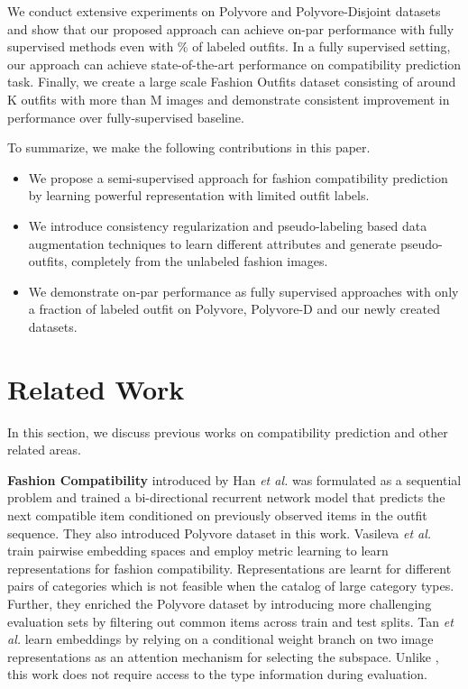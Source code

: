 \documentclass[sigconf]{acmart}
\newcommand{\etal}{\textit{et al.}}
\begin{document}
We conduct extensive experiments on Polyvore and Polyvore-Disjoint \cite{eccv2018learning} datasets and show that our proposed approach can achieve on-par performance with fully supervised methods even with \% of labeled outfits. In a fully supervised setting, our approach can achieve state-of-the-art performance on compatibility prediction task. Finally, we create a large scale Fashion Outfits dataset consisting of around K outfits with more than M images and demonstrate consistent improvement in performance over fully-supervised baseline. 

\vspace{1mm}

To summarize, we make the following contributions in this paper.

\begin{itemize}
\item We propose a semi-supervised approach for fashion compatibility prediction by learning powerful representation with limited outfit labels.

\item We introduce consistency regularization and pseudo-labeling based data augmentation techniques to learn different attributes and generate pseudo-outfits, completely from the unlabeled fashion images.

\item We demonstrate on-par performance as fully supervised approaches with only a fraction of labeled outfit on Polyvore, Polyvore-D and our newly created datasets.
\end{itemize} 

\section{Related Work}
In this section, we discuss previous works on compatibility prediction and other related areas.

\vspace{1mm} 

\noindent \textbf{Fashion Compatibility} introduced by Han \etal \cite{bilstm} was formulated as a sequential problem and trained a bi-directional recurrent network model that predicts the next compatible item conditioned on previously observed items in the outfit sequence. They also introduced Polyvore dataset in this work. Vasileva \etal \cite{eccv2018learning} train pairwise embedding spaces and employ metric learning to learn representations for fashion compatibility. Representations are learnt for different pairs of categories which is not feasible when the catalog of large category types. Further, they enriched the Polyvore dataset by introducing more challenging evaluation sets by filtering out common items across train and test splits. Tan \etal \cite{iccv2019learning} learn embeddings by relying on a conditional weight branch on two image representations as an attention mechanism for selecting the subspace. Unlike \cite{eccv2018learning}, this work does not require access to the type information during evaluation. 
\end{document}
